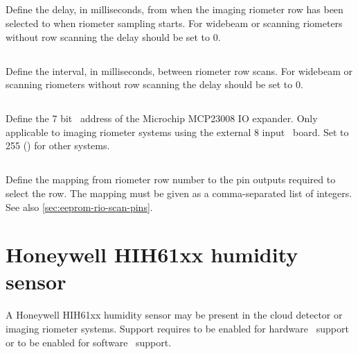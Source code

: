\subsection[rio-presample-delay-ms]{}

Define the delay, in milliseconds, from when the imaging riometer row has been
selected to when riometer sampling starts. For widebeam or scanning riometers
without row scanning the delay should be set to 0.

\subsection[rio-row-scan-interval-ms]{}

Define the interval, in milliseconds, between riometer row scans. For widebeam
or scanning riometers without row scanning the delay should be set to 0.

\subsection[rio-gpio-address]{}

Define the 7 bit \itwoc\ address of the Microchip MCP23008 IO expander. Only
applicable to imaging riometer systems using the external 8 input \adc\ board.
Set to 255 () for other systems.

\subsection[rio-scan-mapping]{}
\label{sec:eeprom-rio-scan-mapping}

Define the mapping from riometer row number to the pin outputs required to
select the row. The mapping must be given as a comma-separated list of integers.
See also \ref{sec:eeprom-rio-scan-pins}.
\section{Honeywell HIH61xx humidity sensor}

A Honeywell HIH61xx humidity sensor may be present in the cloud
detector or imaging riometer systems. Support requires
 to be enabled for hardware \itwoc\ support
or  to be enabled for software \itwoc\
support.

\subsection[hih61xx-present]{}

